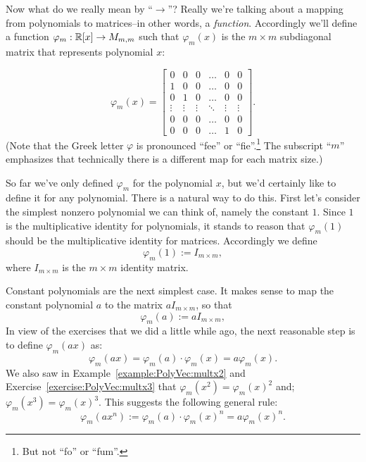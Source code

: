 Now what do we really mean by ``$\rightarrow$''? Really we're talking about a mapping from polynomials to matrices--in other words, a \emph{function}. Accordingly we'll define a function  $\varphi_m: \mathbb{R}[x] \rightarrow M_{m,m}$ such that $\varphi_m(x)$ is the $m\times m$  subdiagonal matrix that represents polynomial $x$:

\[\varphi_m(x) = \left[\begin{array}{cccccc}0 & 0 & 0 & \hdots & 0 & 0\\1 & 0 & 0 & \hdots & 0 & 0\\0 & 1 & 0 & \hdots & 0 & 0\\\vdots & \vdots & \vdots & \ddots & \vdots & \vdots\\0 & 0 & 0 & \hdots & 0 & 0\\0 & 0 & 0 & \hdots & 1 & 0\end{array}\right].\]
\noindent
(Note that the Greek letter $\varphi$ is pronounced ``fee'' or ``fie''.\footnote{But not ``fo'' or ``fum''.}  The subscript ``$m$'' emphasizes that technically there is a different map for each matrix size.)

So far we've only defined $\varphi_m$ for the polynomial $x$, but we'd certainly like to define it for any polynomial. There is a natural way to do this. First let's consider the simplest nonzero polynomial we can think of, namely the constant $1$.  Since $1$ is the multiplicative identity for polynomials, it stands to reason that $\varphi_m(1)$ should be the multiplicative identity for matrices.  Accordingly we define
\[ \varphi_m(1) := I_{m \times m},\]
where  $I_{m \times m}$ is the $m \times m$ identity matrix. 

Constant polynomials are the next simplest case. It makes sense to map the constant polynomial $a$ to the matrix $aI_{m \times m}$, so that
\[ \varphi_m(a) := aI_{m \times m},\]
In view of the exercises that we did a little while ago, the next reasonable step is to define $\varphi_m(ax)$ as:
\[  \varphi_m(ax) = \varphi_m(a) \cdot \varphi_m(x) = a \varphi_m(x). \]
We also saw in Example~\ref{example:PolyVec:multx2} and Exercise~\ref{exercise:PolyVec:multx3} that $ \varphi_m(x^2) = \varphi_m(x)^2$ and; $\varphi_m(x^3) =   \varphi_m(x)^3$. This suggests the following general rule:
\[ \varphi_m(ax^n) :=   \varphi_m(a) \cdot \varphi_m(x)^n =   a\varphi_m(x)^n. \]

